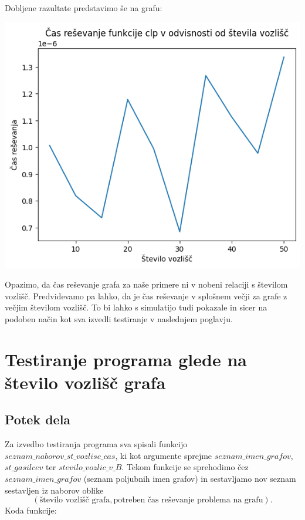 \documentclass[a4paper, 12pt]{article}
\begin{document}
Dobljene razultate predstavimo še na grafu: \\
\begin{center}
    \includegraphics[scale=0.4]{cas}
\end{center}

\noindent Opazimo, da čas reševanje grafa za naše primere ni v nobeni relaciji s
številom vozlišč.
Predvidevamo pa lahko, da je čas reševanje v splošnem večji za grafe z večjim 
številom vozlišč. To bi lahko s simulatijo tudi pokazale in sicer na podoben način
kot sva izvedli testiranje v naslednjem poglavju. 

\pagebreak

\overfullrule=0pt
\section{Testiranje programa glede na število vozlišč grafa}

\subsection{Potek dela}

Za izvedbo testiranja programa sva spisali funkcijo $seznam\_naborov\_st\_vozlisc\_cas$, ki
kot argumente sprejme $seznam\_imen\_grafov$, $st\_gasilcev$ ter $stevilo\_vozlic\_v\_B$. Tekom
funkcije se sprehodimo čez $seznam\_imen\_grafov$ (seznam poljubnih imen grafov) in sestavljamo 
nov seznam sestavljen iz naborov oblike  
$$\left( \text{število vozlišč grafa}, \text{potreben čas reševanje problema na grafu} \right).$$
Koda funkcije:
\end{document}
